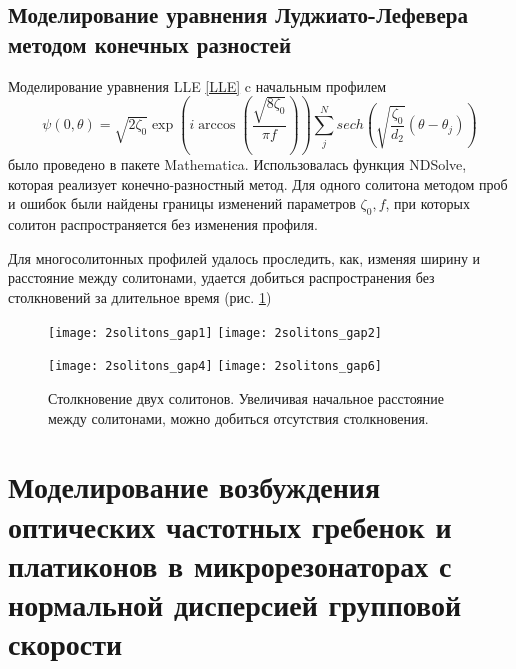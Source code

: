 \subsection{Моделирование уравнения Луджиато-Лефевера методом конечных разностей}

Моделирование уравнения LLE \eqref{LLE} c начальным профилем
\begin{equation} \label{initial_cond_soliton}
\psi(0,\theta)=\sqrt{2\zeta_0}\exp (i \arccos(\frac{\sqrt{8\zeta_0}}{\pi f}))\sum_j^N sech(\sqrt{\frac{\zeta_0}{d_2}}(\theta-\theta_j))
\end{equation}
было проведено в пакете Mathematica. Использовалась функция NDSolve, которая реализует конечно-разностный метод. Для одного солитона методом проб и ошибок были найдены границы изменений параметров $\zeta_0,f$, при которых солитон распространяется без изменения профиля.

Для многосолитонных профилей удалось проследить, как, изменяя ширину и расстояние между солитонами, удается добиться распространения без столкновений за длительное время (рис. \ref{2solitons})
\begin{figure}
  \texttt{[image: 2solitons\_gap1]}
  \texttt{[image: 2solitons\_gap2]}
\end{figure}

\begin{figure}
  \texttt{[image: 2solitons\_gap4]}
  \texttt{[image: 2solitons\_gap6]}
  \caption{Столкновение двух солитонов. Увеличивая начальное расстояние между солитонами, можно добиться отсутствия столкновения.} \label{2solitons}
\end{figure}

%


\section{Моделирование возбуждения оптических частотных гребенок и платиконов в микрорезонаторах с нормальной дисперсией групповой скорости}

